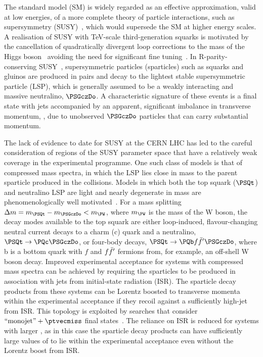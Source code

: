 The standard model (SM) is widely regarded as an effective
approximation, valid at low energies, of a more complete theory of
particle interactions, such as supersymmetry
(SUSY)~\cite{ref:SUSY-1, ref:SUSY0, ref:SUSY1, ref:SUSY2, ref:SUSY3,
  ref:SUSY4, ref:hierarchy1, ref:hierarchy2}, which would supersede
the SM at higher energy scales. A realisation of SUSY with TeV-scale
third-generation squarks is motivated by the cancellation of
quadratically divergent loop corrections to the mass of the Higgs
boson~\cite{ref:atlashiggsdiscovery, ref:cmshiggsdiscoverylong}
avoiding the need for significant fine tuning~\cite{ref:hierarchy1,
  ref:hierarchy2, ref:barbierinsusy}. In R-parity-conserving
SUSY~\cite{Farrar:1978xj}, supersymmetric particles (sparticles) such
as squarks and gluinos are produced in pairs and decay to the lightest
stable supersymmetric particle (LSP), which is generally assumed to be
a weakly interacting and massive neutralino, $\PSGczDo$. A
characteristic signature of these events is a final state with jets
accompanied by an apparent, significant imbalance in transverse
momentum, \ptvecmiss, due to unobserved $\PSGczDo$ particles that can
carry substantial momentum.

The lack of evidence to date for SUSY at the CERN LHC has led to the
careful consideration of regions of the SUSY parameter space that have
a relatively weak coverage in the experimental programme.  One such
class of models is that of compressed mass spectra, in which the LSP
lies close in mass to the parent sparticle produced in the collisions.
Models in which both the top squark ($\PSQt$) and neutralino LSP are
light and nearly degenerate in mass are phenomenologically well
motivated~\cite{Boehm:1999tr,Boehm:1999bj,Balazs:2004bu,
  Martin:2007gf,
  Martin:2007hn,Carena:2008mj,Grober:2014aha,Grober:2015fia}.  For a
mass splitting $\dm = m_{\PSQt} - m_{\PSGczDo} < m_{\PW}$, where
$m_{\PW}$ is the mass of the W boson, the decay modes available to
the top squark are either loop-induced, flavour-changing neutral
current decays to a charm (c) quark and a neutralino, $\PSQt
\to \PQc\PSGczDo$, or four-body decays, $\PSQt
\to {\PQb \ffbp} \PSGczDo$, where b is a bottom
quark with $f$ and ${f{\bar{f}'}}$ fermions from, for example, an
off-shell W boson decay. Improved experimental acceptance for systems
with compressed mass spectra can be achieved by requiring the
sparticles to be produced in association with jets from initial-state
radiation (ISR). The sparticle decay products from these systems can
be Lorentz boosted to transverse momenta within the experimental
acceptance if they recoil against a sufficiently high-\pt jet from
ISR. This topology is exploited by searches that consider
$\text{``monojet''}  +  \ptvecmiss$ final states~\cite{atlas-13,
  atlas-6, cms-9}. The reliance on ISR is reduced for systems with
larger \dm, as in this case the sparticle decay products can have
sufficiently large values of \pt to lie within the experimental
acceptance even without the Lorentz boost from ISR.

